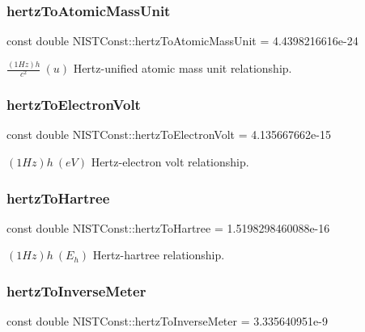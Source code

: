 \subsubsection{\texorpdfstring{hertz\+To\+Atomic\+Mass\+Unit}{hertzToAtomicMassUnit}}
{\footnotesize\ttfamily const double N\+I\+S\+T\+Const\+::hertz\+To\+Atomic\+Mass\+Unit = 4.\+4398216616e-\/24}

$\frac{(1 Hz)h}{c^2} \ (u)$ Hertz-\/unified atomic mass unit relationship. \mbox{\label{group___n_i_s_t_const-_hertz_ga035f43de5d8ad8208675c53a0057d14d}} 
\subsubsection{\texorpdfstring{hertz\+To\+Electron\+Volt}{hertzToElectronVolt}}
{\footnotesize\ttfamily const double N\+I\+S\+T\+Const\+::hertz\+To\+Electron\+Volt = 4.\+135667662e-\/15}

$(1 Hz)h \ (eV)$ Hertz-\/electron volt relationship. \mbox{\label{group___n_i_s_t_const-_hertz_ga2ededb8b750b44cde6d83c1c07b6a870}} 
\subsubsection{\texorpdfstring{hertz\+To\+Hartree}{hertzToHartree}}
{\footnotesize\ttfamily const double N\+I\+S\+T\+Const\+::hertz\+To\+Hartree = 1.\+5198298460088e-\/16}

$(1 Hz)h \ (E_h)$ Hertz-\/hartree relationship. \mbox{\label{group___n_i_s_t_const-_hertz_ga6d5ccd7fed8ad7f2abb5c368565a1666}} 
\subsubsection{\texorpdfstring{hertz\+To\+Inverse\+Meter}{hertzToInverseMeter}}
{\footnotesize\ttfamily const double N\+I\+S\+T\+Const\+::hertz\+To\+Inverse\+Meter = 3.\+335640951e-\/9}

